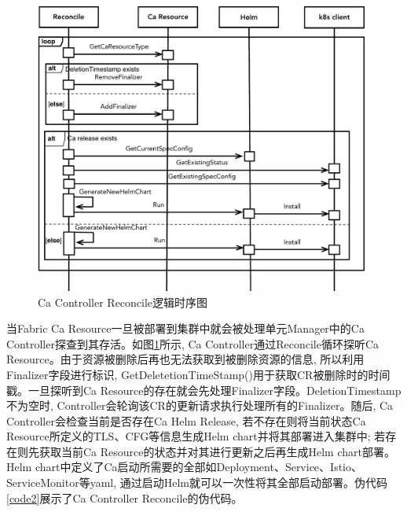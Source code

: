 \begin{figure}[!htbp] %
    \centering %
    \includegraphics[width=0.98\textwidth]{FIGs/chapter4/reconcile.pdf} %
    \caption{Ca Controller Reconcile逻辑时序图} %
    \label{reconcile} %
\end{figure}%

当Fabric Ca Resource一旦被部署到集群中就会被处理单元Manager中的Ca  Controller探查到其存活。如图\ref{reconcile}所示, Ca Controller通过Reconcile循环探听Ca Resource。由于资源被删除后再也无法获取到被删除资源的信息, 所以利用Finalizer字段进行标识, GetDeletetionTimeStamp()用于获取CR被删除时的时间戳。一旦探听到Ca Resource的存在就会先处理Finalizer字段。DeletionTimestamp不为空时, Controller会轮询该CR的更新请求执行处理所有的Finalizer。随后, Ca Controller会检查当前是否存在Ca Helm Release, 若不存在则将当前状态Ca Resource所定义的TLS、CFG等信息生成Helm chart并将其部署进入集群中; 若存在则先获取当前Ca Resource的状态并对其进行更新之后再生成Helm chart部署。Helm chart中定义了Ca启动所需要的全部如Deployment、Service、Istio、ServiceMonitor等yaml, 通过启动Helm就可以一次性将其全部启动部署。伪代码\ref{code2}展示了Ca Controller Reconcile的伪代码。

